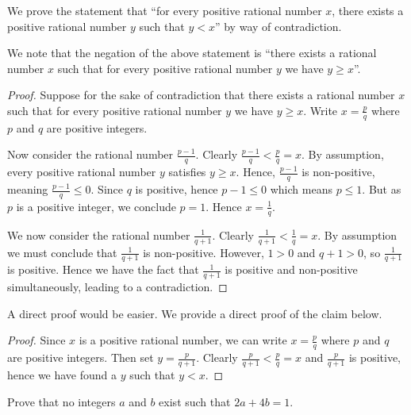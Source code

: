 \begin{example}
    \setlength{\parindent}{1.5em}

    We prove the statement that ``for every positive rational number $x$, there exists a positive rational number $y$ such that $y < x$'' by way of contradiction.

    We note that the negation of the above statement is ``there exists a rational number $x$ such that for every positive rational number $y$ we have $y \geq x$''.
    \begin{proof}
        Suppose for the sake of contradiction that there exists a rational number $x$ such that for every positive rational number $y$ we have $y \geq x$. Write $x = \frac pq$ where $p$ and $q$ are positive integers.

        Now consider the rational number $\frac{p-1}{q}$. Clearly $\frac{p-1}{q} < \frac pq = x$. By assumption, every positive rational number $y$ satisfies $y \geq x$. Hence, $\frac{p-1}{q}$ is non-positive, meaning $\frac{p-1}{q} \leq 0$. Since $q$ is positive, hence $p - 1 \leq 0$ which means $p \leq 1$. But as $p$ is a positive integer, we conclude $p = 1$. Hence $x = \frac 1q$.

        We now consider the rational number $\frac{1}{q+1}$. Clearly $\frac{1}{q+1} < \frac{1}{q} = x$. By assumption we must conclude that $\frac{1}{q+1}$ is non-positive. However, $1 > 0$ and $q + 1 > 0$, so $\frac{1}{q+1}$ is positive. Hence we have the fact that $\frac{1}{q+1}$ is positive and non-positive simultaneously, leading to a contradiction.
    \end{proof}
\end{example}
\begin{remark}
    A direct proof would be easier. We provide a direct proof of the claim below.
    \begin{proof}
        Since $x$ is a positive rational number, we can write $x = \frac pq$ where $p$ and $q$ are positive integers. Then set $y = \frac{p}{q+1}$. Clearly $\frac{p}{q+1} < \frac{p}{q} = x$ and $\frac{p}{q+1}$ is positive, hence we have found a $y$ such that $y < x$.
    \end{proof}
\end{remark}

\begin{exercise}
    Prove that no integers $a$ and $b$ exist such that $2a + 4b = 1$.
\end{exercise}

